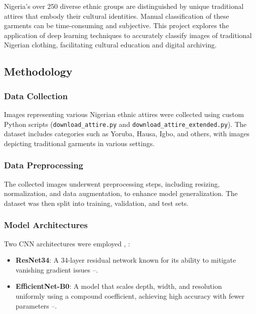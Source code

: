 \documentclass[
  journal,
]{IEEEtran}%
\begin{document}
Nigeria's over 250 diverse ethnic groups are distinguished by unique
traditional attires that embody their cultural identities. Manual
classification of these garments can be time-consuming and subjective.
This project explores the application of deep learning techniques to
accurately classify images of traditional Nigerian clothing,
facilitating cultural education and digital archiving.

\subsection{Methodology}\label{methodology}

\subsubsection{Data Collection}\label{data-collection}

Images representing various Nigerian ethnic attires were collected using
custom Python scripts (\texttt{download\_attire.py} and
\texttt{download\_attire\_extended.py}). The dataset includes categories
such as Yoruba, Hausa, Igbo, and others, with images depicting
traditional garments in various settings.

\subsubsection{Data Preprocessing}\label{data-preprocessing}

The collected images underwent preprocessing steps, including resizing,
normalization, and data augmentation, to enhance model generalization.
The dataset was then split into training, validation, and test sets.

\subsubsection{Model Architectures}\label{model-architectures}

Two CNN architectures were employed
,
:

\begin{itemize}
\item
  \textbf{ResNet34}: A 34-layer residual network known for its ability
  to mitigate vanishing gradient issues
  --.
\item
  \textbf{EfficientNet-B0}: A model that scales depth, width, and
  resolution uniformly using a compound coefficient, achieving high
  accuracy with fewer parameters
  --.
\end{itemize}
\end{document}
